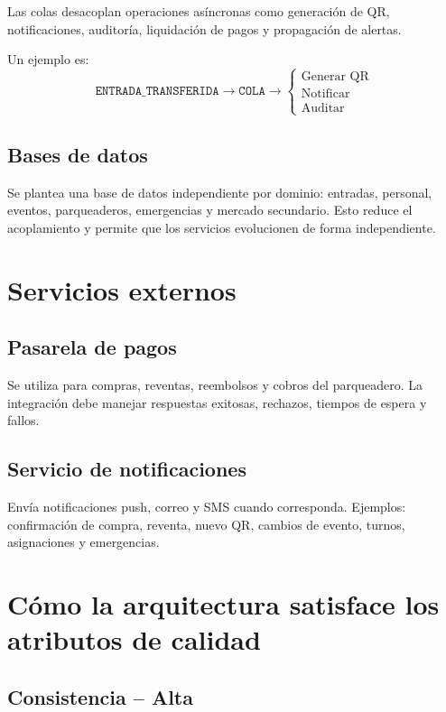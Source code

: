 \documentclass[12pt,a4paper]{article}
\begin{document}
Las colas desacoplan operaciones asíncronas como generación de QR, notificaciones, auditoría, liquidación de pagos y propagación de alertas.

Un ejemplo es:
\[
\texttt{ENTRADA\_TRANSFERIDA}
\rightarrow
\texttt{COLA}
\rightarrow
\begin{cases}
\text{Generar QR}\\
\text{Notificar}\\
\text{Auditar}
\end{cases}
\]

\subsection{Bases de datos}

Se plantea una base de datos independiente por dominio: entradas, personal, eventos, parqueaderos, emergencias y mercado secundario. Esto reduce el acoplamiento y permite que los servicios evolucionen de forma independiente.

\section{Servicios externos}

\subsection{Pasarela de pagos}

Se utiliza para compras, reventas, reembolsos y cobros del parqueadero. La integración debe manejar respuestas exitosas, rechazos, tiempos de espera y fallos.

\subsection{Servicio de notificaciones}

Envía notificaciones push, correo y SMS cuando corresponda. Ejemplos: confirmación de compra, reventa, nuevo QR, cambios de evento, turnos, asignaciones y emergencias.

\section{Cómo la arquitectura satisface los atributos de calidad}

\subsection{Consistencia -- Alta}
\end{document}
